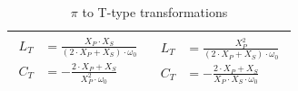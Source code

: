 \begin{table}[H]
\begin{tabular}{ | c | c | }
\begin{minipage}{.4\textwidth}
         { \begin{align}
              L_T &= \frac{X_P \cdot X_S}{(2 \cdot X_P + X_S) \cdot \omega_0} \\
              C_T &= -\frac{2 \cdot X_P + X_S}{X_P^2 \cdot \omega_0}
     \end{align}}
    \end{minipage}
    &
        \begin{minipage}{.4\textwidth}
         { \begin{align}
              L_T &= \frac{X_P ^2}{(2 \cdot X_P + X_S) \cdot \omega_0}\\
              C_T &= -\frac{2 \cdot X_P + X_S}{X_P \cdot X_S \cdot \omega_0}
     \end{align}}
    \end{minipage}
    \\ \hline
  \end{tabular}
  \caption{$\pi$ to T-type transformations}
  \label{tbl:pi-to-tee-transformation}
\end{table}



